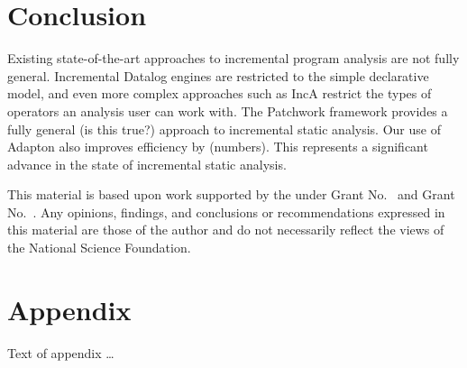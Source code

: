 \documentclass[acmlarge,anonymous]{acmart}\settopmatter{printfolios=true}
\begin{document}
\section{Conclusion}

Existing state-of-the-art approaches to incremental program analysis are not fully general. Incremental Datalog engines are restricted to the simple declarative model, and even more complex approaches such as IncA restrict the types of operators an analysis user can work with. The Patchwork framework provides a fully general (is this true?) approach to incremental static analysis. Our use of Adapton also improves efficiency by (numbers). This represents a significant advance in the state of incremental static analysis.

\begin{acks}                            %
  This material is based upon work supported by the
   under Grant
  No.~ and Grant
  No.~.  Any opinions, findings, and
  conclusions or recommendations expressed in this material are those
  of the author and do not necessarily reflect the views of the
  National Science Foundation.
\end{acks}


%


\appendix
\section{Appendix}

Text of appendix \ldots
\end{document}
